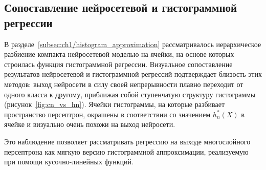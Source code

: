 


\subsection{Сопоставление нейросетевой и гистограммной регрессии}

В разделе~\cref{subsec:ch1/histogram_approximation} рассматривалось иерархическое разбиение компакта нейросетевой моделью на ячейки, на основе которых строилась функция гистограммной регрессии. Визуальное сопоставление результатов нейросетевой и гистограммной регрессий подтверждает близость этих методов: выход нейросети в силу своей непрерывности плавно переходит от одного класса к другому, приближая собой ступенчатую структуру гистограммы (рисунок~\cref{fig:cn_vs_hn}). Ячейки гистограммы, на которые разбивает пространство персептрон, окрашены в соответствии со значением \(h_n^*(X)\) в ячейке и визуально очень похожи на выход нейросети.

Это наблюдение позволяет рассматривать регрессию на выходе многослойного персептрона как мягкую версию гистограммной аппроксимации, реализуемую при помощи кусочно-линейных функций.


